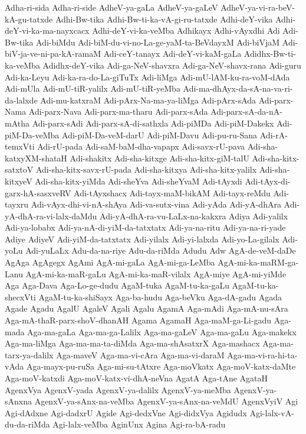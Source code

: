 {Adha-ri-sida
Adha-ri-side
AdheV-ya-gaLa
AdheV-ya-gaLeV
AdheV-ya-vi-ra-beV-kA-gu-tatxde
Adhi-Bw-tika
Adhi-Bw-ti-ka-vA-gi-ru-tatxde
Adhi-deY-vika
Adhi-deY-vi-ka-ma-nayxcacx
Adhi-deY-vi-ka-veMba
Adhikayx
Adhi-vAyxdhi
Adi
Adi-Bw-tika
Adi-biMdu
Adi-biM-du-vi-no-La-ge-yaM-ta-BeVdayxM
Adi-biVjaM
Adi-biV-ja-ve-ni-pa-kA-ramaM
Adi-ceY-tanayx
Adi-deY-vi-kaM-gaLa
Adidhx-Bw-ti-ka-veMba
Adidhx-deY-vika
Adi-ga-NeV-shavxra
Adi-ga-NeV-shavx-rana
Adi-guru
Adi-ka-Leyu
Adi-ka-ra-do-La-giTuTx
Adi-liMga
Adi-mU-lAM-ku-ra-voM-dAda
Adi-mUla
Adi-mU-tiR-yalilx
Adi-mU-tiR-yeMba
Adi-ma-dhAyx-da-sA-na-va-ri-da-lalxde
Adi-mu-katxraM
Adi-pArx-Na-ma-ya-liMga
Adi-pArx-sAda
Adi-parx-Nama
Adi-parx-Nava
Adi-parx-ma-tharu
Adi-parx-sAda
Adi-parx-sA-da-nA-mAtha
Adi-parx-sAdi
Adi-parx-sA-di-sathxla
Adi-piMDa
Adi-piM-Dakekx
Adi-piM-Da-veMba
Adi-piM-Da-veM-darU
Adi-piM-Davu
Adi-pu-ru-Sana
Adi-rA-temxVti
Adi-rU-pada
Adi-saM-baM-dha-vapapx
Adi-savx-rU-pava
Adi-sha-katxyXM-shataH
Adi-shakitx
Adi-sha-kitxge
Adi-sha-kitx-giM-talU
Adi-sha-kitx-satxtoV
Adi-sha-kitx-savx-rU-pada
Adi-sha-kitxya
Adi-sha-kitx-yalilx
Adi-sha-kitxyeV
Adi-sha-kitx-yiMda
Adi-sheYva
Adi-sheYvaM
Adi-tAyxdi
Adi-tAyx-di-garx-hA-sasxveRV
Adi-tAyxshacx
Adi-tayx-maM-bikAM
Adi-tayx-reMdu
Adi-tayxru
Adi-vAyx-dhi-vi-nA-shAya
Adi-va-sutx-vina
Adi-yAda
Adi-yA-dhAra
Adi-yA-dhA-ra-vi-lalx-daMdu
Adi-yA-dhA-ra-vu-LaLx-na-kakxra
Adiya
Adi-yalilx
Adi-ya-lobabx
Adi-ya-nA-di-yiM-da-tatxtatx
Adi-ya-na-ritu
Adi-ya-na-ri-yade
Adiye
AdiyeV
Adi-yiM-da-tatxtatx
Adi-yilalx
Adi-yi-lalxda
Adi-yo-La-gilalx
Adi-yoLu
Adi-yuLaLx
Adu-da-na-riye
Adu-da-riMda
Adudu
Adw
AgA-de-veM-daDe
AgAga
AgAgegx
AgAmi
AgA-mi-gaLa
AgA-mi-ga-LeMba
AgA-mi-ka-maRM-ga-Lanu
AgA-mi-ka-maR-gaLu
AgA-mi-ka-maR-vilalx
AgA-miye
AgA-mi-yiMde
Aga
Aga-Dava
Aga-Lo-ge-dudu
AgaM-tuka
AgaM-tu-ka-gaLu
AgaM-tu-ka-shecxVti
AgaM-tu-ka-shiSayx
Aga-ba-hudu
Aga-beVku
Aga-dA-gadu
Agada
Agade
Agadu
AgalU
AgaleV
Agali
Agalu
AgamA
Aga-mAdi
Aga-mA-nu-sAra
Aga-mA-thaR-parx-shoV-dhanAH
Agama
AgamaH
Aga-maM-ga-Li-gadu
Aga-mada
Aga-ma-gaLa
Aga-ma-ga-Lalilx
Aga-ma-gaLeV
Aga-ma-gaLu
Aga-makekx
Aga-ma-liMga
Aga-ma-ma-ta-diMda
Aga-ma-shAsatxrX
Aga-mashacx
Aga-ma-tarx-ya-dalilx
Aga-maveV
Aga-ma-vi-cAra
Aga-ma-vi-daraM
Aga-ma-vi-ra-hi-ta-vAda
Aga-mayx-pu-ruSa
Aga-mi-su-tAtxre
Aga-moVkatx
Aga-moV-katx-daMte
Aga-moV-katxdi
Aga-moV-katx-vi-dhA-neVna
AgatA
Aga-tAne
AgataH
AgenxVya
AgenxV-yada
AgenxV-ya-dalilx
AgenxV-ya-meMba
AgenxV-ya-sAnxna
AgenxV-ya-sAnx-na-veMba
AgenxV-ya-sAnx-na-veMdU
AgenxVyiV
Agi
Agi-dAdxne
Agi-dadxrU
Agide
Agi-dedxVne
Agi-didxVya
Agidudx
Agi-lalx-vA-du-da-riMda
Agi-lalx-veMba
AginUnx
Agina
Agi-ra-bA-radu
}
